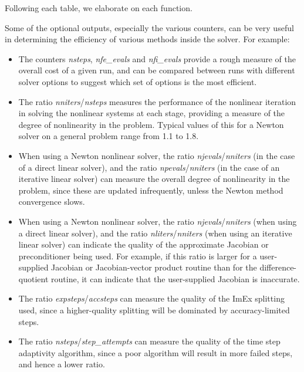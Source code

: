 \documentclass[letterpaper,10pt,english]{sphinxmanual}
\begin{document}
Following each table, we elaborate on each function.

Some of the optional outputs, especially the various counters, can be
very useful in determining the efficiency of various methods inside
the {\hyperref[c_interface/User_callable:c.ARKode]{\emph{}}} solver.  For example:
\begin{itemize}
\item {} 
The counters \emph{nsteps}, \emph{nfe\_evals} and \emph{nfi\_evals} provide a rough
measure of the overall cost of a given run, and can be compared
between runs with different solver options to suggest which set of
options is the most efficient.

\item {} 
The ratio \emph{nniters}/\emph{nsteps} measures the performance of the
nonlinear iteration in solving the nonlinear systems at each stage,
providing a measure of the degree of nonlinearity in the problem.
Typical values of this for a Newton solver on a general problem
range from 1.1 to 1.8.

\item {} 
When using a Newton nonlinear solver, the ratio \emph{njevals}/\emph{nniters}
(in the case of a direct linear solver), and the ratio
\emph{npevals}/\emph{nniters} (in the case of an iterative linear solver)
can measure the overall degree of nonlinearity in the problem,
since these are updated infrequently, unless the Newton method
convergence slows.

\item {} 
When using a Newton nonlinear solver, the ratio \emph{njevals}/\emph{nniters}
(when using a direct linear solver), and the ratio
\emph{nliters}/\emph{nniters} (when using an iterative linear solver) can
indicate the quality of the approximate Jacobian or preconditioner being
used.  For example, if this ratio is larger for a user-supplied
Jacobian or Jacobian-vector product routine than for the
difference-quotient routine, it can indicate that the user-supplied
Jacobian is inaccurate.

\item {} 
The ratio \emph{expsteps}/\emph{accsteps} can measure the quality of the ImEx
splitting used, since a higher-quality splitting will be dominated
by accuracy-limited steps.

\item {} 
The ratio \emph{nsteps}/\emph{step\_attempts} can measure the quality of the
time step adaptivity algorithm, since a poor algorithm will result
in more failed steps, and hence a lower ratio.

\end{itemize}
\end{document}
